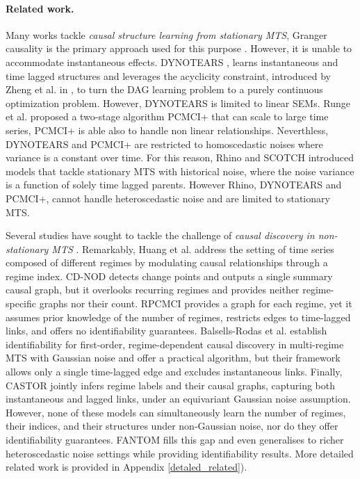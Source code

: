 \paragraph{Related work. }Many works tackle \textit{causal structure learning from stationary MTS}, Granger causality is the primary approach used for this purpose \citep{lowe2022amortized,bussmann2021neural}. However, it is unable to accommodate instantaneous effects. DYNOTEARS \citep{pamfil2020dynotears}, learns instantaneous and time lagged structures and leverages the acyclicity constraint, introduced by Zheng et al. in \citep{zheng2018dags}, to turn the DAG learning problem to a purely continuous optimization problem. However, DYNOTEARS is limited to linear SEMs. Runge et al. \citep{runge2020discovering} proposed a two-stage algorithm PCMCI+ that can scale to large time series, PCMCI+ is able also to handle non linear relationships. Neverthless, DYNOTEARS and PCMCI+ are restricted to homoscedastic noises where variance is a constant over time. For this reason, Rhino \citep{gong2022rhino} and SCOTCH \citep{wang2023neural} introduced models that tackle stationary MTS with historical noise, where the noise variance is a function of solely time lagged parents. However Rhino, DYNOTEARS and PCMCI+, cannot handle heteroscedastic noise and are limited to stationary MTS.

Several studies have sought to tackle the challenge of \textit{causal discovery in non-stationary MTS} \citep{huang2020causal, gunther2024causal, saggioro2020reconstructing, mameche2025spacetime}. Remarkably, Huang et al. \citep{huang2020causal} address the setting of time series composed of different regimes by modulating causal relationships through a regime index. CD-NOD detects change points and outputs a single summary causal graph, but it overlooks recurring regimes and provides neither regime-specific graphs nor their count. RPCMCI \citep{saggioro2020reconstructing} provides a graph for each regime, yet it assumes prior knowledge of the number of regimes, restricts edges to time-lagged links, and offers no identifiability guarantees. Balsells-Rodas et al. \citep{balsellsidentifiability} establish identifiability for first-order, regime-dependent causal discovery in multi-regime MTS with Gaussian noise and offer a practical algorithm, but their framework allows only a single time-lagged edge and excludes instantaneous links. Finally, CASTOR \citep{rahmanicausal} jointly infers regime labels and their causal graphs, capturing both instantaneous and lagged links, under an equivariant Gaussian noise assumption. However, none of these models can simultaneously learn the number of regimes, their indices, and their structures under non-Gaussian noise, nor do they offer identifiability guarantees. FANTOM fills this gap and even generalises to richer heteroscedastic noise settings while providing identifiability results. More detailed related work is provided in Appendix \ref{detaled_related}).